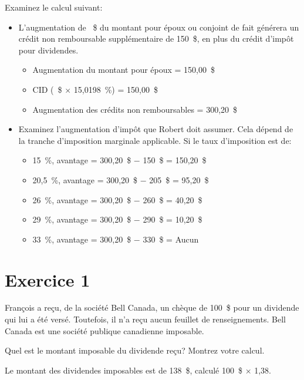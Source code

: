 Examinez le calcul suivant:
\begin{itemize}
	\item L'augmentation de ~\$ du montant pour époux ou conjoint de fait générera un crédit non remboursable supplémentaire de 150~\$, en plus du crédit d'impôt pour dividendes.
	\begin{itemize}
		\item Augmentation du montant pour époux = 150,00~\$
		\item CID (~\$ $\times$ 15,0198~\%) = 150,00~\$
		\item Augmentation des crédits non remboursables = 300,20~\$
	\end{itemize}
	\item Examinez l'augmentation d'impôt que Robert doit assumer. Cela dépend de la tranche d'imposition marginale applicable. Si le taux d'imposition est de:
	\begin{itemize}
		\item 15~\%, avantage = 300,20~\$ $-$ 150~\$ = 150,20~\$
		\item 20,5~\%, avantage = 300,20~\$ $-$ 205~\$ = 95,20~\$
		\item 26~\%, avantage = 300,20~\$ $-$ 260~\$ = 40,20~\$
		\item 29~\%, avantage = 300,20~\$ $-$ 290~\$ = 10,20~\$
		\item 33~\%, avantage = 300,20~\$ $-$ 330~\$ = Aucun
	\end{itemize}
\end{itemize}




\section{Exercice 1}
\setcounter{question}{0}
\begin{question}
	François a reçu, de la société Bell Canada, un chèque de 100~\$ pour un dividende qui lui a été versé. Toutefois, il n'a reçu aucun feuillet de renseignements. Bell Canada est une société publique canadienne imposable.
\end{question}
\setcounter{sousQuestion}{0}
\begin{sousQuestion}
	Quel est le montant imposable du dividende reçu? Montrez votre calcul.
\end{sousQuestion}
Le montant des dividendes imposables est de 138~\$, calculé 100~\$ $\times$ 1,38.

